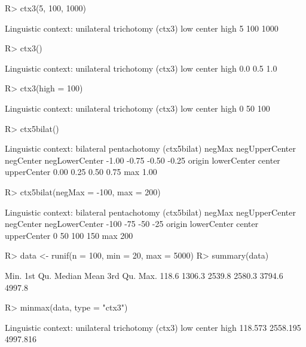 \documentclass{article}\usepackage[]{graphicx}\usepackage[]{color}
\begin{document}
\begin{Schunk}
% --begin: "ctx"
\begin{Sinput}
R> ctx3(5, 100, 1000)
\end{Sinput}
\begin{Soutput}
Linguistic context: unilateral trichotomy (ctx3)
   low center   high 
     5    100   1000 
\end{Soutput}
\begin{Sinput}
R> ctx3()
\end{Sinput}
\begin{Soutput}
Linguistic context: unilateral trichotomy (ctx3)
   low center   high 
   0.0    0.5    1.0 
\end{Soutput}
\begin{Sinput}
R> ctx3(high = 100)
\end{Sinput}
\begin{Soutput}
Linguistic context: unilateral trichotomy (ctx3)
   low center   high 
     0     50    100 
\end{Soutput}
\begin{Sinput}
R> ctx5bilat()
\end{Sinput}
\begin{Soutput}
Linguistic context: bilateral pentachotomy (ctx5bilat)
        negMax negUpperCenter      negCenter negLowerCenter 
         -1.00          -0.75          -0.50          -0.25 
        origin    lowerCenter         center    upperCenter 
          0.00           0.25           0.50           0.75 
           max 
          1.00 
\end{Soutput}
\begin{Sinput}
R> ctx5bilat(negMax = -100, max = 200)
\end{Sinput}
\begin{Soutput}
Linguistic context: bilateral pentachotomy (ctx5bilat)
        negMax negUpperCenter      negCenter negLowerCenter 
          -100            -75            -50            -25 
        origin    lowerCenter         center    upperCenter 
             0             50            100            150 
           max 
           200 
\end{Soutput}
%
% --end: "ctx"
\end{Schunk}

\begin{Schunk}
% --begin: "minmax"
\begin{Sinput}
R> data <- runif(n = 100, min = 20, max = 5000)
R> summary(data)
\end{Sinput}
\begin{Soutput}
   Min. 1st Qu.  Median    Mean 3rd Qu.    Max. 
  118.6  1306.3  2539.8  2580.3  3794.6  4997.8 
\end{Soutput}
\begin{Sinput}
R> minmax(data, type = "ctx3")
\end{Sinput}
\begin{Soutput}
Linguistic context: unilateral trichotomy (ctx3)
     low   center     high 
 118.573 2558.195 4997.816 
\end{Soutput}
%
% --end: "minmax"
\end{Schunk}
\end{document}
